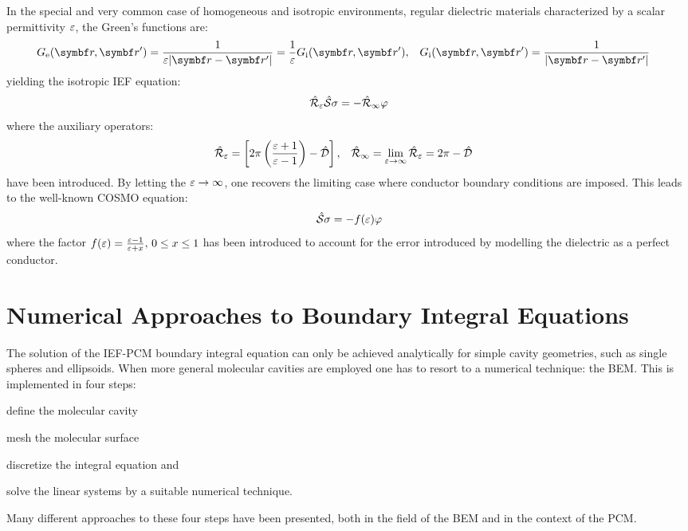 In the special and very common case of homogeneous and isotropic
environments, \ie regular dielectric materials characterized by a scalar
permittivity $\varepsilon$, the Green's functions are:
\begin{alignat}{2}
  \Ge = \frac{1}{\diel|\vect{r}-\vect{r}^\prime|} = \frac{1}{\diel} \Gi,
  \quad&
  \Gi = \frac{1}{|\vect{r}-\vect{r}^\prime|}
\end{alignat}
yielding the isotropic \acrshort{IEF} equation:
\begin{equation}\label{eq:isotropic-IEF}
  \hat{\mathcal{R}}_\varepsilon\hat{\mathcal{S}}\sigma = - \hat{\mathcal{R}}_\infty\varphi
\end{equation}
where the auxiliary operators:
\begin{alignat}{2}
  \hat{\mathcal{R}}_\varepsilon = \left[
  2\pi \left(\frac{\varepsilon+1}{\varepsilon-1}\right) - \hat{\mathcal{D}}
  \right],
  \quad&
  \hat{\mathcal{R}}_\infty =  \lim_{\varepsilon\rightarrow\infty}\hat{\mathcal{R}}_\varepsilon
  = 2\pi-\hat{\mathcal{D}}
\end{alignat}
have been introduced.
By letting the $\varepsilon\rightarrow\infty$, one recovers the limiting case
where conductor boundary conditions are imposed. This leads to the
well-known \gls{COSMO} equation:\autocite{Klamt1993-mj, Cossi2003-xe}
\begin{equation}
  \hat{\mathcal{S}}\sigma = - f(\varepsilon)\varphi
\end{equation}
where the factor $f(\varepsilon) = \frac{\varepsilon-1}{\varepsilon+x},\, 0\leq x \leq 1$
has been introduced to account for the error introduced by modelling the
dielectric as a perfect conductor.

\section{Numerical Approaches to Boundary Integral Equations}\label{sec:BEM}

The solution of the \acrshort{IEF}-\acrshort{PCM} boundary integral equation can
only be achieved analytically for simple cavity geometries, such as
single spheres and ellipsoids.
When more general molecular cavities are employed one has to resort to a
numerical technique: the \gls{BEM}. This is implemented in four steps:
\begin{enumerate*}[label={\alph*)},font={\color{PMS1797}}]
    \item define the molecular cavity
    \item mesh the molecular surface \label{item:mesh}
    \item discretize the integral equation \label{item:discretize} and
    \item solve the linear systems by a suitable numerical technique.
\end{enumerate*}
Many different approaches to these four steps have been presented, both
in the field of the \acrshort{BEM} and in the context of the \acrshort{PCM}.

